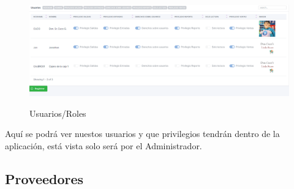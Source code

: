 \documentclass[a4paper,DIV=12]{scrreprt}
\begin{document}
	
		\begin{figure}[!htb]
		\centering
		\includegraphics[scale=0.4]{USUARIOPS.PNG}\\
		\caption{Usuarios/Roles}
	\end{figure}

Aquí se podrá ver nuestos usuarios y que privilegios tendrán dentro de la aplicación, está vista solo será por el Administrador.\\



\subsection{Proveedores}
\end{document}
